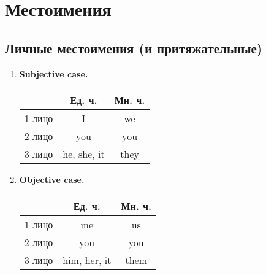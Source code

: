 \documentclass[oneside]{book}
\begin{document}
\chapter{Местоимения}
\section{Личные местоимения (и притяжательные)}
\begin{enumerate}
    \item \textbf{Subjective case.}
    \begin{center}
        \begin{tabular}{|c|c|c|}
            \hline

            & Ед. ч. & Мн. ч.
            \\
            \hline

            1 лицо & I & we
            \\
            \hline

            2 лицо & you & you
            \\
            \hline

            3 лицо & he, she, it & they
            \\
            \hline
        \end{tabular}
    \end{center}

    \item \textbf{Objective case.}
    \begin{center}
        \begin{tabular}{|c|c|c|}
            \hline

            & Ед. ч. & Мн. ч.
            \\
            \hline

            1 лицо & me & us
            \\
            \hline

            2 лицо & you & you
            \\
            \hline

            3 лицо & him, her, it & them
            \\
            \hline
        \end{tabular}
    \end{center}


\end{enumerate}
\end{document}
